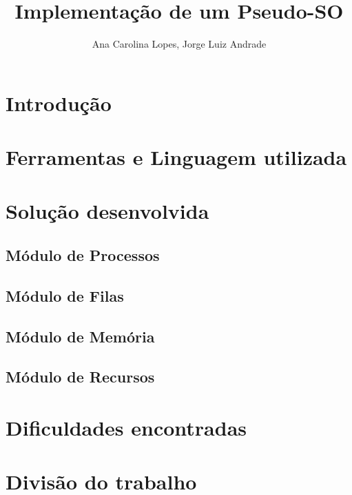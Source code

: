 \documentclass[a4paper]{article}
\title{Implementação de um Pseudo-SO}
\author{Ana Carolina Lopes, Jorge Luiz Andrade}
\date{}
\begin{document}
\maketitle

\section{Introdução}

\section{Ferramentas e Linguagem utilizada}

\section{Solução desenvolvida}
\subsection{Módulo de Processos}

\subsection{Módulo de Filas}

\subsection{Módulo de Memória}

\subsection{Módulo de Recursos}

\section{Dificuldades encontradas}

\section{Divisão do trabalho}


\end{document}
